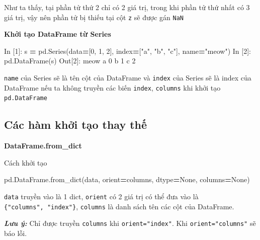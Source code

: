 \documentclass[
]{book}
\makeatletter
\newenvironment{Shaded}{\begin{snugshade}}{\end{snugshade}}
\newcommand{\DecValTok}[1]{\textcolor[rgb]{0.00,0.00,0.81}{#1}}
\newcommand{\NormalTok}[1]{#1}
\newcommand{\OperatorTok}[1]{\textcolor[rgb]{0.81,0.36,0.00}{\textbf{#1}}}
\newcommand{\StringTok}[1]{\textcolor[rgb]{0.31,0.60,0.02}{#1}}
\newcommand{\VariableTok}[1]{\textcolor[rgb]{0.00,0.00,0.00}{#1}}
\newenvironment{kframe}{%
\medskip{}
\setlength{\fboxsep}{.8em}
 \def\at@end@of@kframe{}%
 \ifinner\ifhmode%
  \def\at@end@of@kframe{\end{minipage}}%
  \begin{minipage}{\columnwidth}%
 \fi\fi%
 \def\FrameCommand##1{\hskip\@totalleftmargin \hskip-\fboxsep
 \colorbox{shadecolor}{##1}\hskip-\fboxsep
     \hskip-\linewidth \hskip-\@totalleftmargin \hskip\columnwidth}%
 \MakeFramed {\advance\hsize-\width
   \@totalleftmargin\z@ \linewidth\hsize
   \@setminipage}}%
 {\par\unskip\endMakeFramed%
 \at@end@of@kframe}
\newenvironment{rmdblock}[1]
  {
  \begin{itemize}
  \renewcommand{\labelitemi}{
    \raisebox{-.7\height}[0pt][0pt]{
      {\setkeys{Gin}{width=3em,keepaspectratio}\texttt{[image: images/\#1]}}
    }
  }
  \setlength{\fboxsep}{1em}
  \begin{kframe}
  \item
  }
  {
  \end{kframe}
  \end{itemize}
  }
\newenvironment{rmdnote}
  {\begin{rmdblock}{note}}
  {\end{rmdblock}}
\makeatother
\begin{document}
Như ta thấy, tại phần tử thứ 2 chỉ có 2 giá trị, trong khi phần tử thứ nhất có 3 giá trị, vậy nên phần tử bị thiếu tại cột \texttt{z} sẽ được gán \texttt{NaN}

\textbf{Khởi tạo DataFrame từ Series}

\begin{Shaded}
\begin{Highlighting}[]
\NormalTok{In [}\DecValTok{1}\NormalTok{]: s }\OperatorTok{=}\NormalTok{ pd.Series(data}\OperatorTok{=}\NormalTok{[}\DecValTok{0}\NormalTok{, }\DecValTok{1}\NormalTok{, }\DecValTok{2}\NormalTok{], index}\OperatorTok{=}\NormalTok{[}\StringTok{"a"}\NormalTok{, }\StringTok{"b"}\NormalTok{, }\StringTok{"c"}\NormalTok{], name}\OperatorTok{=}\StringTok{"meow"}\NormalTok{)}
\NormalTok{In [}\DecValTok{2}\NormalTok{]: pd.DataFrame(s)}
\NormalTok{Out[}\DecValTok{2}\NormalTok{]: }
\NormalTok{   meow}
\NormalTok{a     }\DecValTok{0}
\NormalTok{b     }\DecValTok{1}
\NormalTok{c     }\DecValTok{2}
\end{Highlighting}
\end{Shaded}

\texttt{name} của Series sẽ là tên cột của DataFrame và \texttt{index} của Series sẽ là index của DataFrame nếu ta không truyền các biến \texttt{index}, \texttt{columns} khi khởi tạo \texttt{pd.DataFrame}

\subsection{Các hàm khởi tạo thay thế}\label{cuxe1c-huxe0m-khux1edfi-tux1ea1o-thay-thux1ebf}

\textbf{DataFrame.from\_dict}

Cách khởi tạo

\begin{Shaded}
\begin{Highlighting}[]
\NormalTok{pd.DataFrame.from\_dict(data, orient}\OperatorTok{=}\StringTok{\textquotesingle{}columns\textquotesingle{}}\NormalTok{, dtype}\OperatorTok{=}\VariableTok{None}\NormalTok{, columns}\OperatorTok{=}\VariableTok{None}\NormalTok{)}
\end{Highlighting}
\end{Shaded}

\texttt{data} truyền vào là 1 dict, \texttt{orient} có 2 giá trị có thể đưa vào là \texttt{\{"columns",\ "index"\}}, \texttt{columns} là danh sách tên các cột của DataFrame.

\begin{rmdnote}
\textbf{\emph{Lưu ý:}} Chỉ được truyền \texttt{columns} khi \texttt{orient="index"}. Khi \texttt{orient="columns"} sẽ báo lỗi.
\end{rmdnote}
\end{document}

